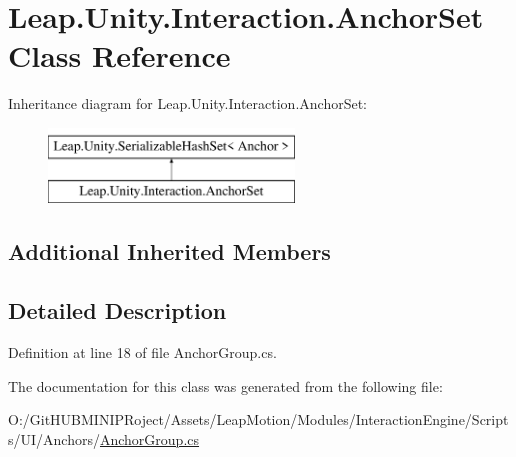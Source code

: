 \hypertarget{class_leap_1_1_unity_1_1_interaction_1_1_anchor_set}{}\section{Leap.\+Unity.\+Interaction.\+Anchor\+Set Class Reference}
\label{class_leap_1_1_unity_1_1_interaction_1_1_anchor_set}
Inheritance diagram for Leap.\+Unity.\+Interaction.\+Anchor\+Set\+:\begin{figure}[H]
\begin{center}
\leavevmode
\includegraphics[height=2.000000cm]{class_leap_1_1_unity_1_1_interaction_1_1_anchor_set}
\end{center}
\end{figure}
\subsection*{Additional Inherited Members}


\subsection{Detailed Description}


Definition at line 18 of file Anchor\+Group.\+cs.



The documentation for this class was generated from the following file\+:\begin{DoxyCompactItemize}
\item 
O\+:/\+Git\+H\+U\+B\+M\+I\+N\+I\+P\+Roject/\+Assets/\+Leap\+Motion/\+Modules/\+Interaction\+Engine/\+Scripts/\+U\+I/\+Anchors/\mbox{\hyperlink{_anchor_group_8cs}{Anchor\+Group.\+cs}}\end{DoxyCompactItemize}
